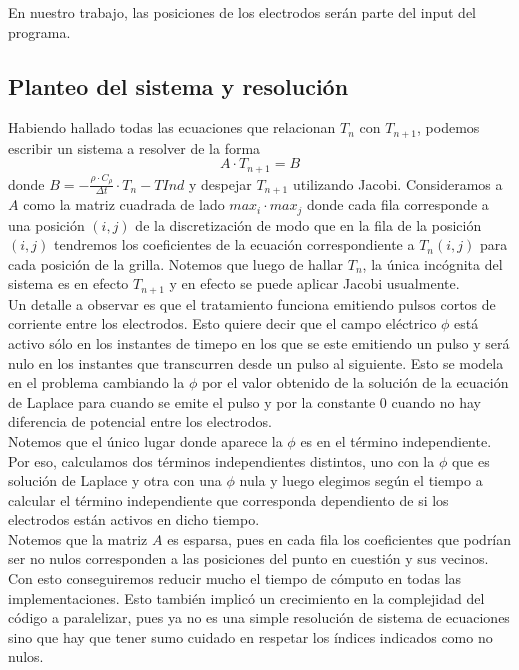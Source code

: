\documentclass[a4paper]{article}
\begin{document}
En nuestro trabajo, las posiciones de los electrodos serán parte del input del programa.

\subsection{Planteo del sistema y resolución}

Habiendo hallado todas las ecuaciones que relacionan $T_n$ con $T_{n+1}$, 
podemos escribir un sistema a resolver de la forma $$A \cdot T_{n+1} = B$$ donde 
$B = -\frac{\rho \cdot C_\rho}{\Delta t} \cdot T_n - TInd$ y 
despejar $T_{n+1}$ utilizando Jacobi. Consideramos a $A$ como la matriz 
cuadrada de lado $max_i \cdot max_j$ donde cada fila corresponde a 
una posición $(i, j)$ de la discretización de modo que en la fila de la 
posición $(i, j)$ tendremos los coeficientes de la ecuación correspondiente 
a $T_n(i,j)$ para cada posición de la grilla. Notemos que luego de hallar $T_n$, 
la única incógnita del sistema es en efecto $T_{n+1}$ y en efecto se puede 
aplicar Jacobi usualmente.\\

Un detalle a observar es que el tratamiento funciona emitiendo pulsos cortos de corriente entre los electrodos. Esto quiere decir que el campo eléctrico $\phi$ está activo sólo en los instantes de timepo en los que se este emitiendo un pulso y será nulo en los instantes que transcurren desde un pulso al siguiente. Esto se modela en el problema cambiando la $\phi$ por el valor obtenido de la solución de la ecuación de Laplace para cuando se emite el pulso y por la constante $0$ cuando no hay diferencia de potencial entre los electrodos.\\
Notemos que el único lugar donde aparece la $\phi$ es en el término independiente. Por eso, calculamos dos términos independientes distintos, uno con la $\phi$ que es solución de Laplace y otra con una $\phi$ nula y luego elegimos según el tiempo a calcular el término independiente que corresponda dependiento de si los electrodos están activos en dicho tiempo.\\

Notemos que la matriz $A$ es esparsa, pues en cada fila los coeficientes 
que podrían ser no nulos corresponden a las posiciones del punto en 
cuestión y sus vecinos. Con esto conseguiremos reducir mucho el tiempo 
de cómputo en todas las implementaciones. Esto también implicó un crecimiento
en la complejidad del código a paralelizar, pues ya no es una simple resolución
de sistema de ecuaciones sino que hay que tener sumo cuidado en respetar
los índices indicados como no nulos. \\
\end{document}
